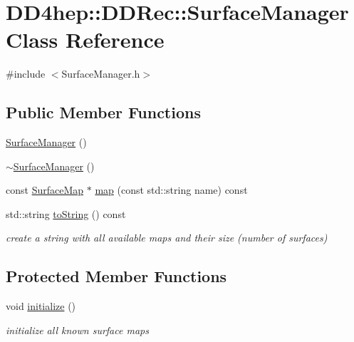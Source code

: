 \hypertarget{class_d_d4hep_1_1_d_d_rec_1_1_surface_manager}{
\section{DD4hep::DDRec::SurfaceManager Class Reference}
\label{class_d_d4hep_1_1_d_d_rec_1_1_surface_manager}
}


{\ttfamily \#include $<$SurfaceManager.h$>$}\subsection*{Public Member Functions}
\begin{DoxyCompactItemize}
\item 
\hyperlink{class_d_d4hep_1_1_d_d_rec_1_1_surface_manager_ade79c900350308b6523dd7964e156af3}{SurfaceManager} ()
\item 
\hyperlink{class_d_d4hep_1_1_d_d_rec_1_1_surface_manager_aaa040a3a6384a601d1c3bc1e79ba4f3f}{$\sim$SurfaceManager} ()
\item 
const \hyperlink{namespace_d_d4hep_1_1_d_d_rec_a04db40c967eb23286f472ac1c17931d1}{SurfaceMap} $\ast$ \hyperlink{class_d_d4hep_1_1_d_d_rec_1_1_surface_manager_aaa5f5c5770932ab79ba79e4e5ab29dc6}{map} (const std::string name) const 
\item 
std::string \hyperlink{class_d_d4hep_1_1_d_d_rec_1_1_surface_manager_aea6e68f5f786d940be70884db7091ebb}{toString} () const 
\begin{DoxyCompactList}\small\item\em create a string with all available maps and their size (number of surfaces) \item\end{DoxyCompactList}\end{DoxyCompactItemize}
\subsection*{Protected Member Functions}
\begin{DoxyCompactItemize}
\item 
void \hyperlink{class_d_d4hep_1_1_d_d_rec_1_1_surface_manager_a418776e91006ad305f08e6bfde675ec9}{initialize} ()
\begin{DoxyCompactList}\small\item\em initialize all known surface maps \item\end{DoxyCompactList}\end{DoxyCompactItemize}
